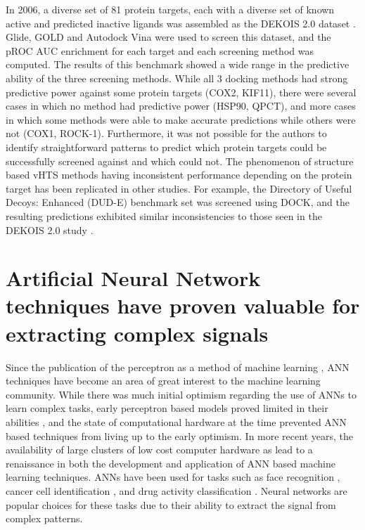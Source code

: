 In 2006, a diverse set of 81 protein targets, each with a diverse set of known active and predicted inactive ligands was assembled as the DEKOIS 2.0 dataset \citep{Bauer:2013de}.
Glide, \ac{GOLD} and Autodock Vina were used to screen this dataset, and the pROC AUC enrichment for each target and each screening method was computed.
The results of this benchmark showed a wide range in the predictive ability of the three screening methods.  
While all 3 docking methods had strong predictive power against some protein targets (COX2, KIF11), there were several cases in which no method had predictive power (HSP90, QPCT), and more cases in which some methods were able to make accurate predictions while others were not (COX1, ROCK-1).
Furthermore, it was not possible for the authors to identify straightforward patterns to predict which protein targets could be successfully screened against and which could not. 
The phenomenon of structure based \ac{vHTS} methods having inconsistent performance depending on the protein target has been replicated in other studies.
For example, the Directory of Useful Decoys: Enhanced (DUD-E) benchmark set was screened using DOCK, and the resulting predictions exhibited similar inconsistencies to those seen in the DEKOIS 2.0 study \citep{Mysinger:2012hu}.

\section{Artificial Neural Network techniques have proven valuable for extracting complex signals}

Since the publication of the perceptron as a method of machine learning \citep{Rosenblatt:1958jc}, \ac{ANN} techniques have become an area of great interest to the machine learning community.
While there was much initial optimism regarding the use of \ac{ANN}s to learn complex tasks, early perceptron based models proved limited in their abilities \citep{Gallant:1990hk}, and the state of computational hardware at the time prevented \ac{ANN} based techniques from living up to the early optimism.
In more recent years, the availability of large clusters of low cost computer hardware as lead to a renaissance in both the development and application of \ac{ANN} based machine learning techniques.
\ac{ANN}s have been used for tasks such as face recognition \citep{Zhao:2003bf}, cancer cell identification \citep{Zhou:2002ew}, and drug activity classification \citep{Gohlke:2002in}.
Neural networks are popular choices for these tasks due to their ability to extract the signal from complex patterns.

